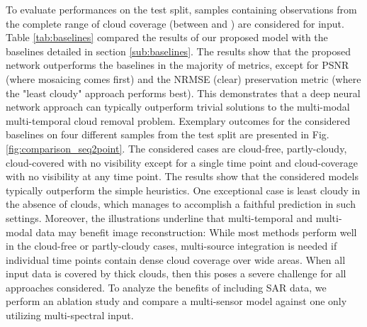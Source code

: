 \documentclass[journal]{IEEEtran}
\begin{document}
To evaluate performances on the test split, samples containing  observations from the complete range of cloud coverage (between  and ) are considered for input. Table \ref{tab:baselines} compared the results of our proposed model with the baselines detailed in section \ref{sub:baselines}. The results show that the proposed network outperforms the baselines in the majority of metrics, except for PSNR (where mosaicing comes first) and the NRMSE (clear) preservation metric (where the "least cloudy" approach performs best).  This demonstrates that a deep neural network approach can typically outperform trivial solutions to the multi-modal multi-temporal cloud removal problem. Exemplary outcomes for the considered baselines on four different samples from the test split are presented in Fig. \ref{fig:comparison_seq2point}. The considered cases are cloud-free, partly-cloudy, cloud-covered with no visibility except for a single time point and cloud-coverage with no visibility at any time point. The results show that the considered models typically outperform the simple heuristics. One exceptional case is least cloudy in the absence of clouds, which manages to accomplish a faithful prediction in such settings. Moreover, the illustrations underline that multi-temporal and multi-modal data may benefit image reconstruction: While most methods perform well in the cloud-free or partly-cloudy cases, multi-source integration is needed if individual time points contain dense cloud coverage over wide areas. When all input data is covered by thick clouds, then this poses a severe challenge for all approaches considered.
To analyze the benefits of including  SAR data, we perform an ablation study and compare a multi-sensor model against one only utilizing multi-spectral  input.
\end{document}
